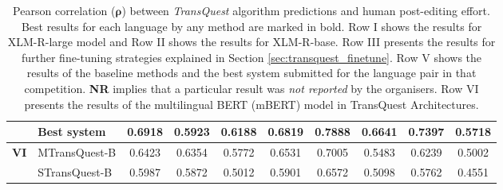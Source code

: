 \begin{table}[t]
\begin{center}
{\begin{tabular}{l l  c c c c c c c c}
			& Best system & 0.6918 & 0.5923 & 0.6188 & 0.6819 & 0.7888 & \textbf{0.6641} & 0.7397 &  0.5718 \\
			\midrule
			\multirow{2}{*}{\bf VI} & MTransQuest-B & 0.6423 & 0.6354 & 0.5772 & 0.6531 & 0.7005 & 0.5483 & 0.6239 & 0.5002 \\
			& STransQuest-B & 0.5987 & 0.5872 & 0.5012 & 0.5901 & 0.6572 & 0.5098& 0.5762 & 0.4551 \\
			\bottomrule
		\end{tabular}
	}
	\end{center}
	\caption[Pearson correlation between TransQuest algorithm predictions and human post-editing effort]{Pearson correlation ($\bm{\rho}$) between \textit{TransQuest} algorithm predictions and human post-editing effort. Best results for each language by any method are marked in bold. Row I shows the results for XLM-R-large model and Row II shows the results for XLM-R-base. Row III presents the results for further fine-tuning strategies explained in Section \ref{sec:transquest_finetune}. Row V shows the results of the baseline methods and the best system submitted for the language pair in that competition. \textbf{NR} implies that a particular result was \textit{not reported} by the organisers. Row VI presents the results of the multilingual BERT (mBERT) model in TransQuest Architectures.} 
	\label{tab:hter_prediction}
\end{table}



